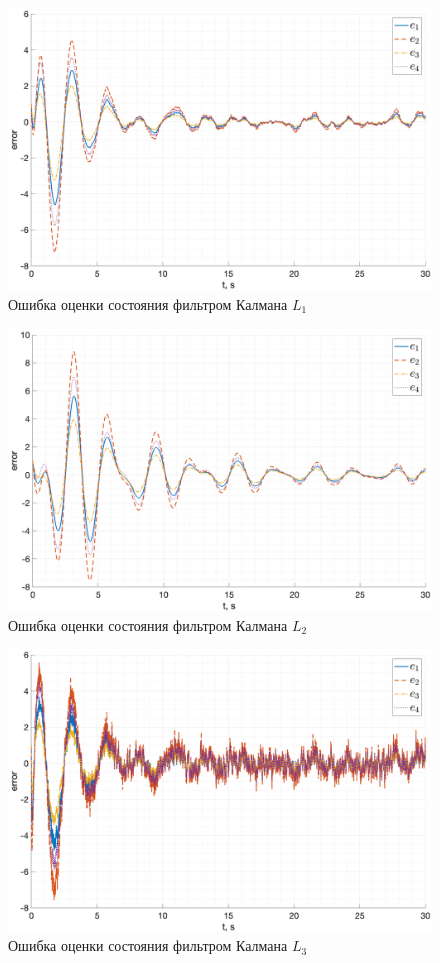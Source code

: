 \begin{figure}[ht!]
    \centering
    \includegraphics[width=\textwidth]{media/plots/kalman_task2/err_1.png}
    \caption{Ошибка оценки состояния фильтром Калмана $L_1$}
    \label{fig:kalman1_err}
\end{figure}
\begin{figure}[ht!]
    \centering
    \includegraphics[width=\textwidth]{media/plots/kalman_task2/err_2.png}
    \caption{Ошибка оценки состояния фильтром Калмана $L_2$}
    \label{fig:kalman2_err}
\end{figure}
\begin{figure}[ht!]
    \centering
    \includegraphics[width=\textwidth]{media/plots/kalman_task2/err_3.png}
    \caption{Ошибка оценки состояния фильтром Калмана $L_3$}
    \label{fig:kalman3_err} 
\end{figure}
